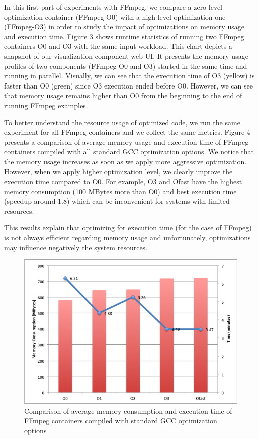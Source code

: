 In this first part of experiments with FFmpeg, we compare a zero-level optimization container (FFmpeg-O0) with a high-level optimization one (FFmpeg-O3) in order to study the impact of optimizations on memory usage and execution time. Figure 3 shows runtime statistics of running two FFmpeg containers O0 and O3 with the same input workload. This chart depicts a snapshot of our visualization component web UI. It presents the memory usage profiles of two components (FFmpeg O0 and O3) started in the same time and running in parallel. Visually, we can see that the execution time of O3 (yellow) is faster than O0 (green) since O3 execution ended before O0. However, we can see that memory usage remains higher than O0 from the beginning to the end of running FFmpeg examples. 

To better understand the resource usage of optimized code, we run the same experiment for all FFmpeg containers and we collect the same metrics. Figure 4 presents a comparison of average memory usage and execution time of FFmpeg containers compiled with all standard GCC optimization options. We notice that the memory usage increases as soon as we apply more aggressive optimization. However, when we apply higher optimization level, we clearly improve the execution time compared to O0. For example, O3 and Ofast have the highest memory consumption (100 MBytes more than O0) and best execution time (speedup around 1.8) which can be inconvenient for systems with limited resources.

This results explain that optimizing for execution time (for the case of FFmpeg) is not always efficient regarding memory usage and unfortunately, optimizations may influence negatively the system resources.
\begin{figure}[hbt]
	\centering
	\includegraphics[width=1\linewidth]{Ressources/infra_ffmpeg_plot1.png}
	\caption{Comparison of average memory consumption and execution time of FFmpeg containers compiled with standard GCC optimization options}
\end{figure}


